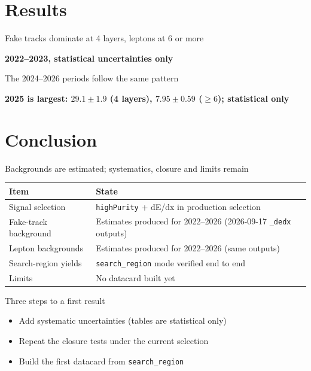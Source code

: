 \documentclass[aspectratio=169,12pt]{beamer}
\newcommand{\takeaway}[1]{\par\vspace{10pt}\centering\small\textbf{#1}\par}
\begin{document}
\section{Results}
\begin{frame}{Fake tracks dominate at 4 layers, leptons at 6 or more}
  \centering\footnotesize\renewcommand{\arraystretch}{0.8}
  
  \vspace{-4pt}\takeaway{2022--2023, statistical uncertainties only}
\end{frame}

\begin{frame}{The 2024--2026 periods follow the same pattern}
  \centering\footnotesize\renewcommand{\arraystretch}{0.8}
  
  \takeaway{2025 is largest: $29.1 \pm 1.9$ (4 layers), $7.95 \pm 0.59$ ($\geq 6$); statistical only}
\end{frame}

\section{Conclusion}
\begin{frame}{Backgrounds are estimated; systematics, closure and limits remain}
  \centering\small
  \begin{tabular}{p{}p{}}
    \toprule
    Item & State \\
    \midrule
    Signal selection & \texttt{highPurity} + dE/dx in production selection \\
    Fake-track background & Estimates produced for 2022--2026 (2026-09-17 \texttt{\_dedx} outputs) \\
    Lepton backgrounds & Estimates produced for 2022--2026 (same outputs) \\
    Search-region yields & \texttt{search\_region} mode verified end to end \\
    Limits & No datacard built yet \\
    \bottomrule
  \end{tabular}
\end{frame}

\begin{frame}{Three steps to a first result}
  \begin{itemize}
    \item Add systematic uncertainties (tables are statistical only)
    \item Repeat the closure tests under the current selection
    \item Build the first datacard from \texttt{search\_region}
  \end{itemize}
\end{frame}
\end{document}
